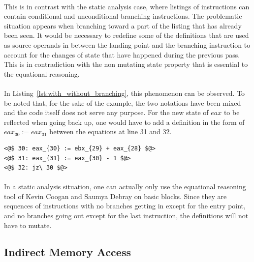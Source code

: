 \paragraph{}
This is in contrast with the static analysis case, where listings of instructions can contain conditional and unconditional branching instructions. The problematic situation appears when branching toward a part of the listing that has already been seen. It would be necessary to redefine some of the definitions that are used as source operands in between the landing point and the branching instruction to account for the changes of state that have happened during the previous pass. This is in contradiction with the non mutating state property that is essential to the equational reasoning.

\paragraph{}
In Listing~\ref{lst:with_without_branching}, this phenomenon can be observed. To be noted that, for the sake of the example, the two notations have been mixed and the code itself does not serve any purpose. For the new state of $eax$ to be reflected when going back up, one would have to add a definition in the form of $eax_{30} := eax_{31}$ between the equations at line 31 and 32. \\

\begin{lstlisting}[caption={Example where the branching instruction disrupt the analysis.}, label={lst:with_without_branching}, frame=tlrb, language={[x86masm]Assembler}]
<@$ 30: eax_{30} := ebx_{29} + eax_{28} $@>
<@$ 31: eax_{31} := eax_{30} - 1 $@>
<@$ 32: jz\ 30 $@>
\end{lstlisting}

\paragraph{}
In a static analysis situation, one can actually only use the equational reasoning tool of Kevin Coogan and Saumya Debray on basic blocks. Since they are sequences of instructions with no branches getting in except for the entry point, and no branches going out except for the last instruction, the definitions will not have to mutate.

\subsection{Indirect Memory Access} \label{sec:pb_indirect_memory_access}
